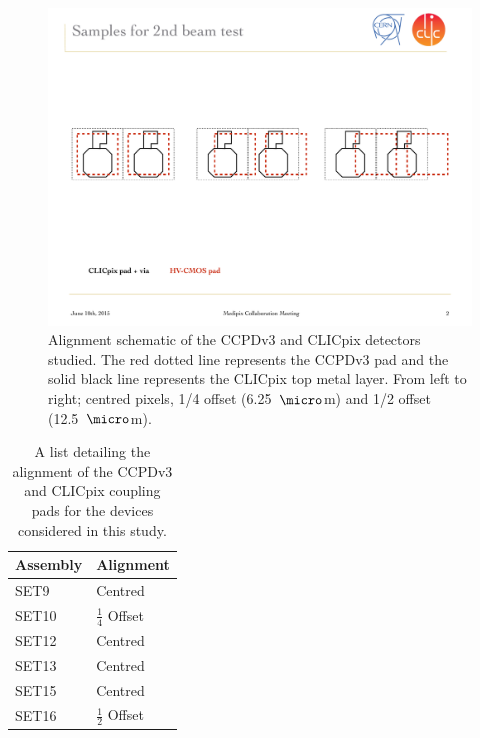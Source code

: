 \begin{figure}[h!]
\centering
\includegraphics[width=1.0\textwidth]{CLICdpVertex/Plots/misalignedPads.pdf}
\caption[Alignment schematic of the CCPDv3 and CLICpix detectors studied.  The red dotted line represents the CCPDv3 pad and the solid black line represents the CLICpix top metal layer.  From left to right; centred pixels, 1/4 offset (6.25~${\micro}$m) and 1/2 offset (12.5~${\micro}$m).]{Alignment schematic of the CCPDv3 and CLICpix detectors studied.  The red dotted line represents the CCPDv3 pad and the solid black line represents the CLICpix top metal layer.  From left to right; centred pixels, 1/4 offset (6.25~${\micro}$m) and 1/2 offset (12.5~${\micro}$m).}
\label{fig:alignment}
\end{figure}

\begin{table}[h!]
\centering
\begin{tabular}{ l l }
\hline
Assembly & Alignment \\ 
\hline
SET9 & Centred \\
SET10 & $\frac{1}{4}$ Offset \\
SET12 & Centred \\
SET13 & Centred \\
SET15 & Centred \\
SET16 & $\frac{1}{2}$ Offset \\
\hline
\end{tabular}
\caption[A list detailing the alignment of the CCPDv3 and CLICpix coupling pads for the devices considered in this study.]{A list detailing the alignment of the CCPDv3 and CLICpix coupling pads for the devices considered in this study.}
\label{table:alignment}
\end{table}

